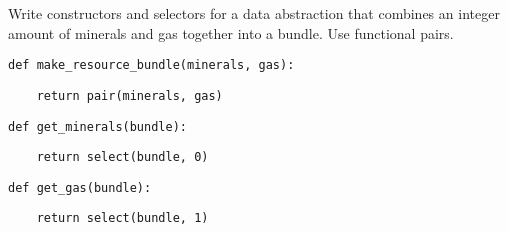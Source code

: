 \question Write constructors and selectors for a data abstraction that combines
an integer amount of minerals and gas together into a bundle. Use functional
pairs.

\begin{lstlisting}
def make_resource_bundle(minerals, gas):
\end{lstlisting}
\begin{solution}[0.5in]
\begin{lstlisting}
    return pair(minerals, gas)
\end{lstlisting}
\end{solution}

\begin{lstlisting}
def get_minerals(bundle):
\end{lstlisting}
\begin{solution}[0.5in]
\begin{lstlisting}
    return select(bundle, 0)
\end{lstlisting}
\end{solution}

\begin{lstlisting}
def get_gas(bundle):
\end{lstlisting}
\begin{solution}[0.5in]
\begin{lstlisting}
    return select(bundle, 1)
\end{lstlisting}
\end{solution}
